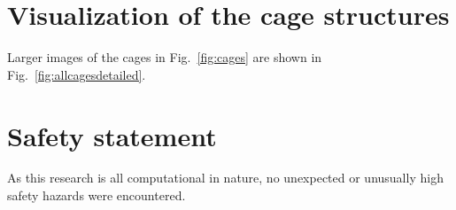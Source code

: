 \documentclass[journal=jacsat,manuscript=article]{achemso}
\begin{document}
\clearpage

\section{Visualization of the cage structures}
Larger images of the cages in Fig.~\ref{fig:cages} are shown in Fig.~\ref{fig:allcagesdetailed}.
\captionsetup[subfigure]{labelformat=empty} %


\newpage
\clearpage

\section{Safety statement}
As this research is all computational in nature, no unexpected or unusually high safety hazards were encountered.

\clearpage


\end{document}
